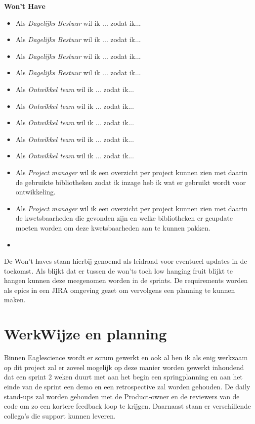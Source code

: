 \textbf{Won't Have}
\begin{itemize}
  \item Als \textit{Dagelijks Bestuur} wil ik  ... zodat ik...
  \item Als \textit{Dagelijks Bestuur} wil ik  ... zodat ik...
  \item Als \textit{Dagelijks Bestuur} wil ik  ... zodat ik...
  \item Als \textit{Dagelijks Bestuur} wil ik  ... zodat ik...
  \item Als \textit{Ontwikkel team } wil ik  ... zodat ik...
  \item Als \textit{Ontwikkel team } wil ik  ... zodat ik...
  \item Als \textit{Ontwikkel team } wil ik  ... zodat ik...
  \item Als \textit{Ontwikkel team } wil ik  ... zodat ik...
  \item Als \textit{Ontwikkel team } wil ik  ... zodat ik...
  \item Als \textit{Project manager} wil ik een overzicht per project kunnen zien met daarin de gebruikte bibliotheken zodat ik inzage heb ik wat er gebruikt wordt voor ontwikkeling.
  \item Als \textit{Project manager} wil ik een overzicht per project kunnen zien met daarin de kwetsbaarheden die gevonden zijn en welke bibliotheken er geupdate moeten worden om deze kwetsbaarheden aan te kunnen pakken.\item
\end{itemize}
De Won't haves staan hierbij genoemd als leidraad voor eventueel updates in de toekomst. Als blijkt dat er tussen de won'ts toch low hanging fruit blijkt te hangen kunnen deze meegenomen worden in de sprints. De requirements worden als epics in een JIRA omgeving gezet om vervolgens een planning te kunnen maken.


\section{WerkWijze en planning}
Binnen Eaglescience wordt er scrum gewerkt en ook al ben ik als enig werkzaam op dit project zal er zoveel mogelijk op deze manier worden gewerkt inhoudend dat een sprint 2 weken duurt met aan het begin een springplanning en aan het einde van de sprint een demo en een retrospective zal worden gehouden. De daily stand-ups zal worden gehouden met de Product-owner en de reviewers van de code om zo een kortere feedback loop te krijgen. Daarnaast staan er verschillende collega's die support kunnen leveren.
